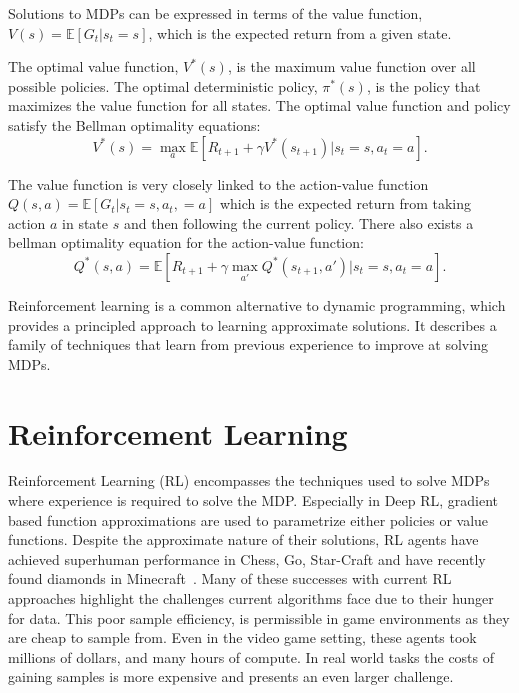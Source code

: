 Solutions to MDPs can be expressed in terms of the value function, $V(s) = \mathbb{E} [ G_t | s_t = s]$, which is the expected return from a given state.

The optimal value function, $V^*(s)$, is the maximum value function over all possible policies. The optimal deterministic policy, $\pi^*(s)$, is the policy that maximizes the value function for all states. The optimal value function and policy satisfy the Bellman optimality equations\cite{bellamn1957mdp}:
\begin{equation}
	V^*(s) = \max_a \mathbb{E} [ R_{t+1} + \gamma V^*(s_{t+1}) | s_t = s, a_t = a].
\end{equation}

The value function is very closely linked to the action-value function $Q(s, a) = \mathbb{E} [G_t | s_t=s, a_t,=a]$ which is the expected return from taking action $a$ in state $s$ and then following the current policy. There also exists a bellman optimality equation for the action-value function:
\begin{equation}
	Q^*(s,a) = \mathbb{E} [ R_{t+1} + \gamma \max_{a'} Q^*(s_{t+1}, a') | s_t = s, a_t = a].
\end{equation}

Reinforcement learning is a common alternative to dynamic programming, which provides a principled approach to learning approximate solutions. It describes a family of techniques that learn from previous experience to improve at solving MDPs.

\section{Reinforcement Learning}
Reinforcement Learning (RL) encompasses the techniques used to solve MDPs where experience is required to solve the MDP. Especially in Deep RL, gradient based function approximations are used to parametrize either policies or value functions. Despite the approximate nature of their solutions, RL agents have achieved superhuman performance in Chess, Go, Star-Craft and have recently found diamonds in Minecraft~\cite{silver2016mastering,silver2017mastering,hafner2023mastering}. Many of these successes with current RL approaches highlight the challenges current algorithms face due to their hunger for data. This poor sample efficiency, is permissible in game environments as they are cheap to sample from. Even in the video game setting, these agents took millions of dollars, and many hours of compute. In real world tasks the costs of gaining samples is more expensive and presents an even larger challenge.

